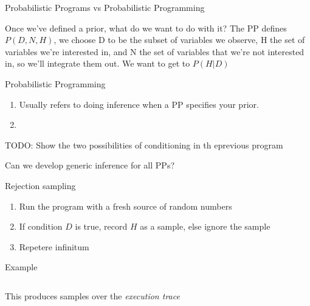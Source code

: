 \begin{frame}{Probabilistic Programs vs Probabilistic Programming}
  \begin{block}{Once we've defined a prior, what do we want to do with it?}  
  The PP defines $P(D,N,H)$, we choose D to be the subset of variables we observe, H the set of variables we're interested in, and N the set of variables that we're not interested in, so we'll integrate them out.  We want to get to $P(H|D)$
  \end{block}
      \begin{block}{Probabilistic Programming}
      \begin{enumerate}
        \item Usually refers to doing inference when a PP specifies your prior.
        \item 
      \end{enumerate}
    \end{block}
    TODO: Show the two possibilities of conditioning in th eprevious program
\end{frame}

\begin{frame}{Can we develop generic inference for all PPs?}
  \begin{block}{Rejection sampling}
    \begin{enumerate}
      \item Run the program with a fresh source of random numbers
      \item If condition $D$ is true, record $H$ as a sample, else ignore the sample
      \item Repetere infinitum
    \end{enumerate}
  \end{block}
  \begin{block}{Example}
    \begin{columns}
      \begin{column}{.4\textwidth}
        
      \end{column}
      \begin{column}{.4\textwidth}
        
      \end{column}
    \end{columns}
  \end{block}
  \begin{block}{This produces samples over the \emph{execution trace}}
    \eg 
  \end{block}
\end{frame}

